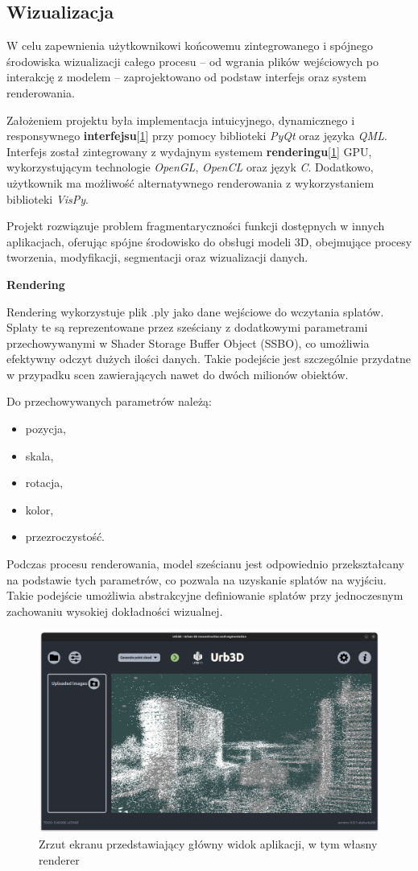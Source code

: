 \subsection{Wizualizacja}
W celu zapewnienia użytkownikowi końcowemu zintegrowanego i spójnego środowiska wizualizacji całego procesu – od wgrania plików wejściowych po interakcję z modelem – zaprojektowano od podstaw interfejs oraz system renderowania.

Założeniem projektu była implementacja intuicyjnego, dynamicznego i responsywnego \textbf{interfejsu}[\ref{fig:rendering}] przy pomocy biblioteki \textit{PyQt} oraz języka \textit{QML}. Interfejs został zintegrowany z wydajnym systemem \textbf{renderingu}[\ref{fig:rendering}] GPU, wykorzystującym technologie \textit{OpenGL}, \textit{OpenCL} oraz język \textit{C}. Dodatkowo, użytkownik ma możliwość alternatywnego renderowania z wykorzystaniem biblioteki \textit{VisPy}.

Projekt rozwiązuje problem fragmentaryczności funkcji dostępnych w innych aplikacjach, oferując spójne środowisko do obsługi modeli 3D, obejmujące procesy tworzenia, modyfikacji, segmentacji oraz wizualizacji danych.

\vspace{10pt}
{\setlength{\parindent}{0pt}
\textbf{Rendering}
}

Rendering wykorzystuje plik .ply jako dane wejściowe do wczytania splatów. Splaty te są reprezentowane przez sześciany z dodatkowymi parametrami przechowywanymi w Shader Storage Buffer Object (SSBO), co umożliwia efektywny odczyt dużych ilości danych. Takie podejście jest szczególnie przydatne w przypadku scen zawierających nawet do dwóch milionów obiektów.

Do przechowywanych parametrów należą: \begin{itemize} \item pozycja, \item skala, \item rotacja, \item kolor, \item przezroczystość. \end{itemize}

Podczas procesu renderowania, model sześcianu jest odpowiednio przekształcany na podstawie tych parametrów, co pozwala na uzyskanie splatów na wyjściu. Takie podejście umożliwia abstrakcyjne definiowanie splatów przy jednoczesnym zachowaniu wysokiej dokładności wizualnej.

\begin{figure}[!ht]
    \centering
    \includegraphics[width=\textwidth]{images/cloud_rendering.png}
    \caption{Zrzut ekranu przedstawiający główny widok aplikacji, w tym własny renderer}
    \label{fig:rendering}
\end{figure}